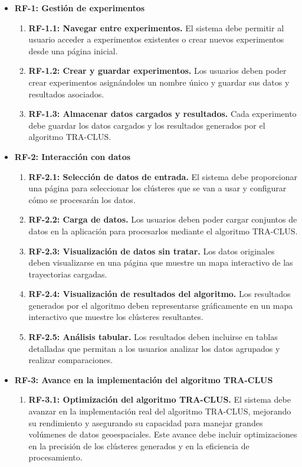 \begin{itemize}

    \item \textbf{RF-1: Gestión de experimentos}
    \begin{enumerate}
        \item \textbf{RF-1.1: Navegar entre experimentos.}  
        El sistema debe permitir al usuario acceder a experimentos existentes o crear nuevos experimentos desde una página inicial.
        \item \textbf{RF-1.2: Crear y guardar experimentos.}  
        Los usuarios deben poder crear experimentos asignándoles un nombre único y guardar sus datos y resultados asociados.
        \item \textbf{RF-1.3: Almacenar datos cargados y resultados.}  
        Cada experimento debe guardar los datos cargados y los resultados generados por el algoritmo TRA-CLUS.
    \end{enumerate}

    \item \textbf{RF-2: Interacción con datos}
    \begin{enumerate}
        \item \textbf{RF-2.1: Selección de datos de entrada.}  
        El sistema debe proporcionar una página para seleccionar los clústeres que se van a usar y configurar cómo se procesarán los datos.
        \item \textbf{RF-2.2: Carga de datos.}  
        Los usuarios deben poder cargar conjuntos de datos en la aplicación para procesarlos mediante el algoritmo TRA-CLUS.
        \item \textbf{RF-2.3: Visualización de datos sin tratar.}  
        Los datos originales deben visualizarse en una página que muestre un mapa interactivo de las trayectorias cargadas.
        \item \textbf{RF-2.4: Visualización de resultados del algoritmo.}  
        Los resultados generados por el algoritmo deben representarse gráficamente en un mapa interactivo que muestre los clústeres resultantes.
        \item \textbf{RF-2.5: Análisis tabular.}  
        Los resultados deben incluirse en tablas detalladas que permitan a los usuarios analizar los datos agrupados y realizar comparaciones.
    \end{enumerate}

    \item \textbf{RF-3: Avance en la implementación del algoritmo TRA-CLUS}
    \begin{enumerate}
        \item \textbf{RF-3.1: Optimización del algoritmo TRA-CLUS.}  
        El sistema debe avanzar en la implementación real del algoritmo TRA-CLUS, mejorando su rendimiento y asegurando su capacidad para manejar grandes volúmenes de datos geoespaciales. Este avance debe incluir optimizaciones en la precisión de los clústeres generados y en la eficiencia de procesamiento.
    \end{enumerate}


\end{itemize}
